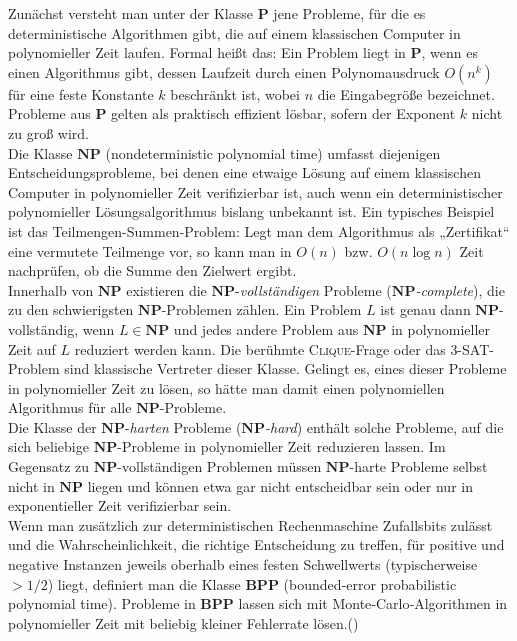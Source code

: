 Zunächst versteht man unter der Klasse \(\mathbf{P}\) jene Probleme, für die es deterministische Algorithmen gibt, die auf einem klassischen Computer in polynomieller Zeit laufen. Formal heißt das: Ein Problem liegt in \(\mathbf{P}\), wenn es einen Algorithmus gibt, dessen Laufzeit durch einen Polynomausdruck \(O(n^k)\) für eine feste Konstante \(k\) beschränkt ist, wobei \(n\) die Eingabegröße bezeichnet. Probleme aus \(\mathbf{P}\) gelten als praktisch effizient lösbar, sofern der Exponent \(k\) nicht zu groß wird.\\

Die Klasse \(\mathbf{NP}\) (nondeterministic polynomial time) umfasst diejenigen Entscheidungsprobleme, bei denen eine etwaige Lösung auf einem klassischen Computer in polynomieller Zeit verifizierbar ist, auch wenn ein deterministischer polynomieller Lösungsalgorithmus bislang unbekannt ist. Ein typisches Beispiel ist das Teilmengen-Summen-Problem: Legt man dem Algorithmus als „Zertifikat“ eine vermutete Teilmenge vor, so kann man in \(O(n)\) bzw. \(O(n\log n)\) Zeit nachprüfen, ob die Summe den Zielwert ergibt.\\

Innerhalb von \(\mathbf{NP}\) existieren die \(\mathbf{NP}\)-\emph{vollständigen} Probleme (\(\mathbf{NP}\)\emph{-complete}), die zu den schwierigsten \(\mathbf{NP}\)-Problemen zählen. Ein Problem \(L\) ist genau dann \(\mathbf{NP}\)-vollständig, wenn \(L\in\mathbf{NP}\) und jedes andere Problem aus \(\mathbf{NP}\) in polynomieller Zeit auf \(L\) reduziert werden kann. Die berühmte \textsc{Clique}-Frage oder das \textsc{3-SAT}-Problem sind klassische Vertreter dieser Klasse. Gelingt es, eines dieser Probleme in polynomieller Zeit zu lösen, so hätte man damit einen polynomiellen Algorithmus für alle \(\mathbf{NP}\)-Probleme.\\

Die Klasse der \(\mathbf{NP}\)-\emph{harten} Probleme (\(\mathbf{NP}\)\emph{-hard}) enthält solche Probleme, auf die sich beliebige \(\mathbf{NP}\)-Probleme in polynomieller Zeit reduzieren lassen. Im Gegensatz zu \(\mathbf{NP}\)-vollständigen Problemen müssen \(\mathbf{NP}\)-harte Probleme selbst nicht in \(\mathbf{NP}\) liegen und können etwa gar nicht entscheidbar sein oder nur in exponentieller Zeit verifizierbar sein.\\

Wenn man zusätzlich zur deterministischen Rechenmaschine Zufallsbits zulässt und die Wahrscheinlichkeit, die richtige Entscheidung zu treffen, für positive und negative Instanzen jeweils oberhalb eines festen Schwellwerts (typischerweise \(>1/2\)) liegt, definiert man die Klasse \(\mathbf{BPP}\) (bounded‑error probabilistic polynomial time). Probleme in \(\mathbf{BPP}\) lassen sich mit Monte‑Carlo‑Algorithmen in polynomieller Zeit mit beliebig kleiner Fehlerrate lösen.(\cite{zotero-1212}) \\

